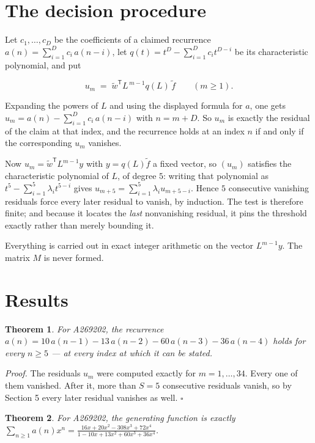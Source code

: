 \documentclass[11pt]{article}
\newtheorem{theorem}{Theorem}
\theoremstyle{definition}
\begin{document}
\section{The decision procedure}

Let $c_1,\dots,c_D$ be the coefficients of a claimed recurrence $a(n) = \sum_{i=1}^{D} c_i\,a(n-i)$, let $q(t) = t^{D} - \sum_{i=1}^{D} c_i t^{D-i}$ be its characteristic polynomial, and put

\[u_m \;=\; \tilde w^{\mathsf T} L^{\,m-1} q(L)\,\tilde f \qquad (m \ge 1).\]

Expanding the powers of $L$ and using the displayed formula for $a$, one gets $u_m = a(n) - \sum_{i=1}^{D} c_i\,a(n-i)$ with $n = m + D$. So $u_m$ is exactly the residual of the claim at that index, and the recurrence holds at an index $n$ if and only if the corresponding $u_m$ vanishes.

Now $u_m = \tilde w^{\mathsf T} L^{m-1} y$ with $y = q(L)\tilde f$ a fixed vector, so $(u_m)$ satisfies the characteristic polynomial of $L$, of degree $5$: writing that polynomial as $t^{5} - \sum_{i=1}^{5} \lambda_i t^{5-i}$ gives $u_{m+5} = \sum_{i=1}^{5} \lambda_i u_{m+5-i}$. Hence $5$ consecutive vanishing residuals force every later residual to vanish, by induction. The test is therefore finite; and because it locates the {\itshape last} nonvanishing residual, it pins the threshold exactly rather than merely bounding it.

Everything is carried out in exact integer arithmetic on the vector $L^{m-1}y$. The matrix $M$ is never formed.

\section{Results}

\begin{theorem} For A269202, the recurrence $a(n) = 10\,a(n-1) - 13\,a(n-2) - 60\,a(n-3) - 36\,a(n-4)$ holds for every $n \ge 5$ --- at every index at which it can be stated.\end{theorem}

{\itshape Proof.} The residuals $u_m$ were computed exactly for $m = 1,\dots,34$. Every one of them vanished. After it, more than $S = 5$ consecutive residuals vanish, so by Section 5 every later residual vanishes as well. $\square$

\begin{theorem} For A269202, the generating function is exactly $\sum_{n\ge 1} a(n)x^n = \frac{16x + 20x^{2} - 308x^{3} + 72x^{4}}{1 - 10x + 13x^{2} + 60x^{3} + 36x^{4}}$.\end{theorem}
\end{document}
